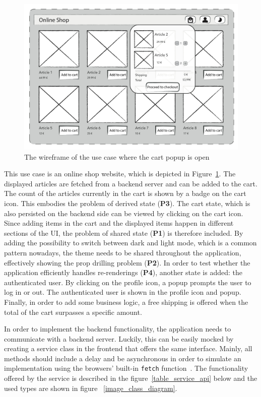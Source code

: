 \begin{figure}[h!]
\centering
\includegraphics{images/use_case}
\caption{The wireframe of the use case where the cart popup is open}
    \label{image_use_case}
\end{figure}

This use case is an online shop
website, which is depicted in Figure~\ref{image_use_case}.
The displayed articles are fetched from
a backend server and can be added to the cart. The count of the articles
currently in the cart is shown by a badge on the cart icon. This
embodies the problem of derived state (\textbf{P3}). The cart state,
which is also persisted on the backend side can be viewed by clicking on
the cart icon. Since adding items in the cart and the displayed items
happen in different sections of the UI, the problem of
shared state (\textbf{P1}) is therefore included. By adding the possibility to switch between
dark and light mode, which is a common pattern nowadays, the theme needs
to be shared throughout the application, effectively showing the prop
drilling problem (\textbf{P2}). In order to test whether the application
efficiently handles re-renderings (\textbf{P4}), another state is added:
the authenticated user. By clicking on the profile icon, a popup prompts
the user to log in or out. The authenticated user is shown in the
profile icon and popup. Finally, in order to add some business logic, a
free shipping is offered when the total of the cart surpasses a specific amount.

In order to implement the backend functionality, the application needs
to communicate with a backend server. Luckily, this can be easily mocked
by creating a service class in the frontend that offers the same
interface. Mainly, all methods should include a delay and be
asynchronous in order to simulate an implementation using the browsers' built-in \texttt{fetch} function~\cite{mozilla_fetch}.
The functionality offered by the service is described in the 
figure~\ref{table_service_api} below and the used types are shown in figure 
~\ref{image_class_diagram}.

